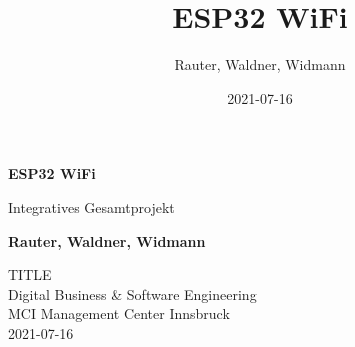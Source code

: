 \documentclass{report}
\begin{document}
\newcommand{\thetitle}{ESP32 WiFi}
\newcommand{\thesubtitle}{Integratives Gesamtprojekt}
\newcommand{\thedate}{2021-07-16}
\newcommand{\theauthor}{Rauter, Waldner, Widmann}

\title{\thetitle}
\date{\thedate}
\author{\theauthor}
		

\begin{titlepage}
    \begin{center}
        \vspace*{1cm}
            
        \Huge
        \textbf{\thetitle}
            
        \vspace{0.5cm}
        \LARGE
		\thesubtitle
            
        \vspace{0.5cm}
            
        \textbf{\theauthor}
            
        \vfill
            
        
		\vfill

        \Large
		TITLE\\
		\vspace{0.5cm}
        Digital Business \& Software Engineering\\
		\vspace{0.5cm}
        MCI Management Center Innsbruck\\
		\vspace{0.5cm}
        \thedate
            
    \end{center}
\end{titlepage}

\tableofcontents









\end{document}
